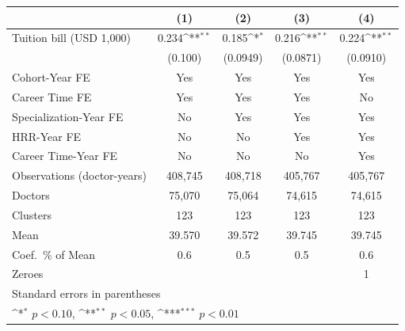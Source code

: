 {
\def\sym#1{\ifmmode^{#1}\else\(^{#1}\)\fi}
\begin{tabular}{l*{4}{c}}
\hline\hline
                    &\multicolumn{1}{c}{(1)}         &\multicolumn{1}{c}{(2)}         &\multicolumn{1}{c}{(3)}         &\multicolumn{1}{c}{(4)}         \\
\hline
Tuition bill (USD 1,000)&       0.234\sym{**} &       0.185\sym{*}  &       0.216\sym{**} &       0.224\sym{**} \\
                    &     (0.100)         &    (0.0949)         &    (0.0871)         &    (0.0910)         \\
[1em]
Cohort-Year FE      &         Yes         &         Yes         &         Yes         &         Yes         \\
[1em]
Career Time FE      &         Yes         &         Yes         &         Yes         &          No         \\
[1em]
Specialization-Year FE&          No         &         Yes         &         Yes         &         Yes         \\
[1em]
HRR-Year FE         &          No         &          No         &         Yes         &         Yes         \\
[1em]
Career Time-Year FE &          No         &          No         &          No         &         Yes         \\
\hline
Observations (doctor-years)&     408,745         &     408,718         &     405,767         &     405,767         \\
Doctors             &      75,070         &      75,064         &      74,615         &      74,615         \\
Clusters            &         123         &         123         &         123         &         123         \\
Mean                &      39.570         &      39.572         &      39.745         &      39.745         \\
Coef.\ \% of Mean   &         0.6         &         0.5         &         0.5         &         0.6         \\
Zeroes              &                     &                     &                     &           1         \\
\hline\hline
\multicolumn{5}{l}{\footnotesize Standard errors in parentheses}\\
\multicolumn{5}{l}{\footnotesize \sym{*} \(p<0.10\), \sym{**} \(p<0.05\), \sym{***} \(p<0.01\)}\\
\end{tabular}
}
